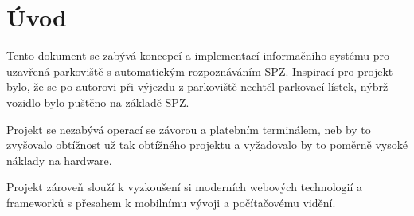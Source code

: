 \chapter{Úvod} \label{uvod}

\noindent
Tento dokument se zabývá koncepcí a implementací informačního systému pro uzavřená
parkoviště s automatickým rozpoznáváním SPZ.
Inspirací pro projekt bylo, že se po autorovi při výjezdu z parkoviště nechtěl
parkovací lístek, nýbrž vozidlo bylo puštěno na základě SPZ.

Projekt se nezabývá operací se závorou a platebním terminálem, neb by to zvyšovalo
obtížnost už tak obtížného projektu a vyžadovalo by to poměrně vysoké
náklady na hardware.

Projekt zároveň slouží k vyzkoušení si moderních webových technologií
a frameworků s přesahem k mobilnímu vývoji a počítačovému vidění.




